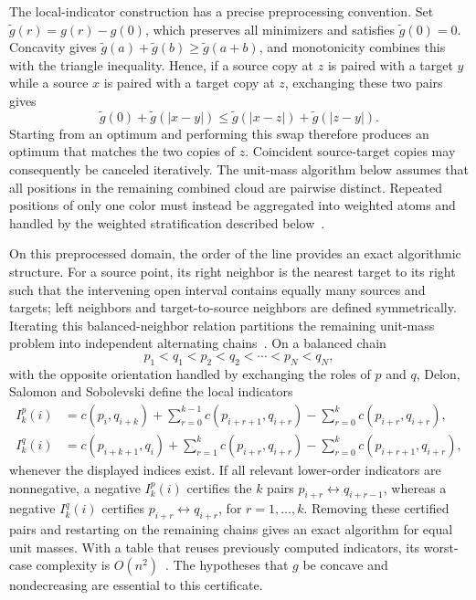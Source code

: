 The local-indicator construction has a precise preprocessing convention. Set $\widetilde g(r)=g(r)-g(0)$, which preserves all minimizers and satisfies $\widetilde g(0)=0$. Concavity gives $\widetilde g(a)+\widetilde g(b)\geq\widetilde g(a+b)$, and monotonicity combines this with the triangle inequality. Hence, if a source copy at $z$ is paired with a target $y$ while a source $x$ is paired with a target copy at $z$, exchanging these two pairs gives
\[
	\widetilde g(0)+\widetilde g(|x-y|)
	\leq \widetilde g(|x-z|)+\widetilde g(|z-y|).
\]
Starting from an optimum and performing this swap therefore produces an optimum that matches the two copies of $z$. Coincident source-target copies may consequently be canceled iteratively. The unit-mass algorithm below assumes that all positions in the remaining combined cloud are pairwise distinct. Repeated positions of only one color must instead be aggregated into weighted atoms and handled by the weighted stratification described below~\cite{delon-concave}.

On this preprocessed domain, the order of the line provides an exact algorithmic structure. For a source point, its right neighbor is the nearest target to its right such that the intervening open interval contains equally many sources and targets; left neighbors and target-to-source neighbors are defined symmetrically. Iterating this balanced-neighbor relation partitions the remaining unit-mass problem into independent alternating chains~\cite{delon-concave}. On a balanced chain
\[
	p_1<q_1<p_2<q_2<\cdots<p_N<q_N,
\]
with the opposite orientation handled by exchanging the roles of $p$ and $q$, Delon, Salomon and Sobolevski define the local indicators
\begin{align*}
	I_k^p(i)
	&=
	c(p_i,q_{i+k})
	+
	\sum_{r=0}^{k-1}c(p_{i+r+1},q_{i+r})
	-
	\sum_{r=0}^{k}c(p_{i+r},q_{i+r}),\\
	I_k^q(i)
	&=
	c(p_{i+k+1},q_i)
	+
	\sum_{r=1}^{k}c(p_{i+r},q_{i+r})
	-
	\sum_{r=0}^{k}c(p_{i+r+1},q_{i+r}),
\end{align*}
whenever the displayed indices exist. If all relevant lower-order indicators are nonnegative, a negative $I_k^p(i)$ certifies the $k$ pairs $p_{i+r}\leftrightarrow q_{i+r-1}$, whereas a negative $I_k^q(i)$ certifies $p_{i+r}\leftrightarrow q_{i+r}$, for $r=1,\ldots,k$. Removing these certified pairs and restarting on the remaining chains gives an exact algorithm for equal unit masses. With a table that reuses previously computed indicators, its worst-case complexity is $O(n^2)$~\cite{delon-concave}. The hypotheses that $g$ be concave and nondecreasing are essential to this certificate.

